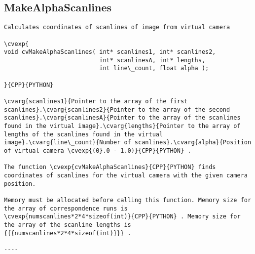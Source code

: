 \subsection{MakeAlphaScanlines}
\begin{verbatim}
Calculates coordinates of scanlines of image from virtual camera

\cvexp{
void cvMakeAlphaScanlines( int* scanlines1, int* scanlines2,
                           int* scanlinesA, int* lengths,
                           int line\_count, float alpha );

}{CPP}{PYTHON}

\cvarg{scanlines1}{Pointer to the array of the first scanlines}.\cvarg{scanlines2}{Pointer to the array of the second scanlines}.\cvarg{scanlinesA}{Pointer to the array of the scanlines found in the virtual image}.\cvarg{lengths}{Pointer to the array of lengths of the scanlines found in the virtual image}.\cvarg{line\_count}{Number of scanlines}.\cvarg{alpha}{Position of virtual camera \cvexp{(0}.0 - 1.0)}{CPP}{PYTHON} .

The function \cvexp{cvMakeAlphaScanlines}{CPP}{PYTHON} finds coordinates of scanlines for the virtual camera with the given camera position.

Memory must be allocated before calling this function. Memory size for the array of correspondence runs is \cvexp{numscanlines*2*4*sizeof(int)}{CPP}{PYTHON} . Memory size for the array of the scanline lengths is {{{numscanlines*2*4*sizeof(int)}}} .

----
\end{verbatim}
